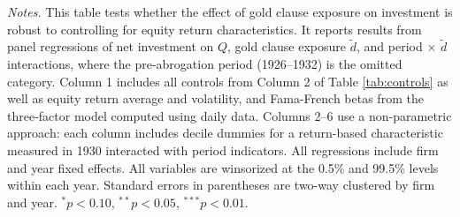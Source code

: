 \begin{table}[p]
\vspace*{3mm} \justifying \noindent
\scriptsize{\textit{Notes.} This table tests whether the effect of gold clause exposure on investment is robust to controlling for equity return characteristics. It reports results from panel regressions of net investment on $Q$, gold clause exposure $\tilde{d}$, and period $\times$ $\tilde{d}$ interactions, where the pre-abrogation period (1926--1932) is the omitted category. Column 1 includes all controls from Column 2 of Table \ref{tab:controls} as well as equity return average and volatility, and Fama-French betas from the three-factor model computed using daily data. Columns 2--6 use a non-parametric approach: each column includes decile dummies for a return-based characteristic measured in 1930 interacted with period indicators. All regressions include firm and year fixed effects. All variables are winsorized at the 0.5\% and 99.5\% levels within each year. Standard errors in parentheses are two-way clustered by firm and year. $^{*}p<0.10$, $^{**}p<0.05$, $^{***}p<0.01$.}
\end{table}